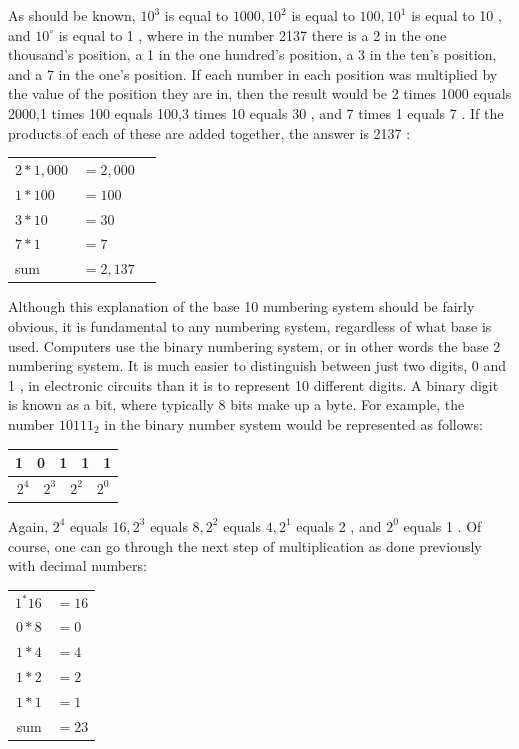 \documentclass[10pt]{book}
\begin{document}
As should be known, $10^{3}$ is equal to $1000,10^{2}$ is equal to $100,10^{1}$ is equal to 10 , and $10^{\circ}$ is equal to 1 , where in the number 2137 there is a 2 in the one thousand's position, a 1 in the one hundred's position, a 3 in the ten's position, and a 7 in the one's position. If each number in each position was multiplied by the value of the position they are in, then the result would be 2 times 1000 equals 2000,1 times 100 equals 100,3 times 10 equals 30 , and 7 times 1 equals 7 . If the products of each of these are added together, the answer is 2137 :

\begin{center}
\begin{tabular}{llr}
$2 * 1,000$ & $=2,000$ \\
$1 * 100$ & $=100$ \\
$3 * 10$ & $=30$ \\
$7 * 1$ & $=7$ \\
\hline
sum & $=2,137$ \\
\hline
\end{tabular}
\end{center}

Although this explanation of the base 10 numbering system should be fairly obvious, it is fundamental to any numbering system, regardless of what base is used. Computers use the binary numbering system, or in other words the base 2 numbering system. It is much easier to distinguish between just two digits, 0 and 1 , in electronic circuits than it is to represent 10 different digits. A binary digit is known as a bit, where typically 8 bits make up a byte. For example, the number $10111_{2}$ in the binary number system would be represented as follows:

\begin{center}
\begin{tabular}{|l|l|l|l|l|}
\hline
1 & 0 & 1 & 1 & 1 \\
\hline
\multicolumn{5}{c}{$2^{4} \quad 2^{3} \quad 2^{2} \quad 2^{0}$} \\
\hline
\end{tabular}
\end{center}

Again, $2^{4}$ equals $16,2^{3}$ equals $8,2^{2}$ equals $4,2^{1}$ equals 2 , and $2^{0}$ equals 1 . Of course, one can go through the next step of multiplication as done previously with decimal numbers:

\begin{center}
\begin{tabular}{rl}
$1{ }^{*} 16$ & $=16$ \\
$0 * 8$ & $=0$ \\
$1 * 4$ & $=4$ \\
$1 * 2$ & $=2$ \\
$1 * 1$ & $=1$ \\
\hline
sum & $=23$ \\
\hline
\end{tabular}
\end{center}
\end{document}

